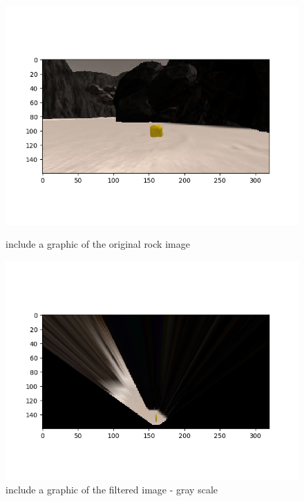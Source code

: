\documentclass[a4paper]{article}
\begin{document}
\begin{figure}[h]
\centering
\begin{minipage}[t]{0.45\linewidth}
\centering
\includegraphics[scale=0.45]{image15}
\vspace{-1.5cm}
\caption{include a graphic of the original rock image}
\end{minipage}
\hspace{0.5cm}
\begin{minipage}[t]{0.45\linewidth}
\centering
\includegraphics[scale=0.45]{image16}
\vspace{-1.5cm}
\caption{include a graphic of the filtered image - gray scale}
\end{minipage}
\end{figure}
\end{document}
